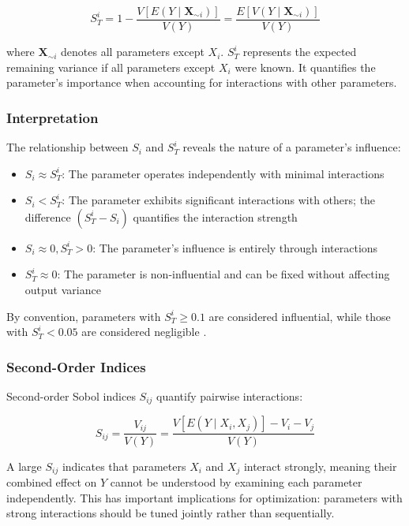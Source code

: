 \begin{equation}
S_T^i = 1 - \frac{V[E(Y \mid \mathbf{X}_{\sim i})]}{V(Y)} = \frac{E[V(Y \mid \mathbf{X}_{\sim i})]}{V(Y)}
\label{eq:sobol_st}
\end{equation}

where $\mathbf{X}_{\sim i}$ denotes all parameters except $X_i$. $S_T^i$ represents the expected remaining variance if all parameters except $X_i$ were known. It quantifies the parameter's importance when accounting for interactions with other parameters.

\subsubsection{Interpretation}

The relationship between $S_i$ and $S_T^i$ reveals the nature of a parameter's influence:

\begin{itemize}
    \item $S_i \approx S_T^i$: The parameter operates independently with minimal interactions
    \item $S_i < S_T^i$: The parameter exhibits significant interactions with others; the difference $(S_T^i - S_i)$ quantifies the interaction strength
    \item $S_i \approx 0, S_T^i > 0$: The parameter's influence is entirely through interactions
    \item $S_T^i \approx 0$: The parameter is non-influential and can be fixed without affecting output variance
\end{itemize}

By convention, parameters with $S_T^i \geq 0.1$ are considered influential, while those with $S_T^i < 0.05$ are considered negligible \citep{saltelli2008global}.

\subsubsection{Second-Order Indices}

Second-order Sobol indices $S_{ij}$ quantify pairwise interactions:

\begin{equation}
S_{ij} = \frac{V_{ij}}{V(Y)} = \frac{V[E(Y \mid X_i, X_j)] - V_i - V_j}{V(Y)}
\label{eq:sobol_s2}
\end{equation}

A large $S_{ij}$ indicates that parameters $X_i$ and $X_j$ interact strongly, meaning their combined effect on $Y$ cannot be understood by examining each parameter independently. This has important implications for optimization: parameters with strong interactions should be tuned jointly rather than sequentially.


